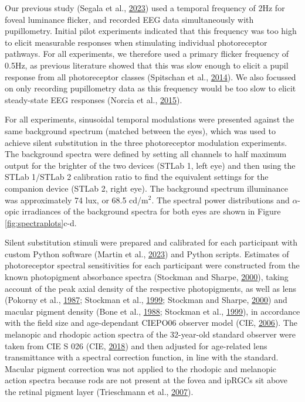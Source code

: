 \documentclass[
]{article}
\begin{document}
Our previous study (Segala et al., \protect\hyperlink{ref-Segala2023}{2023}) used a temporal frequency of 2Hz for foveal luminance flicker, and recorded EEG data simultaneously with pupillometry. Initial pilot experiments indicated that this frequency was too high to elicit measurable responses when stimulating individual photoreceptor pathways. For all experiments, we therefore used a primary flicker frequency of 0.5Hz, as previous literature showed that this was slow enough to elicit a pupil response from all photoreceptor classes (Spitschan et al., \protect\hyperlink{ref-Spitschan2014}{2014}). We also focussed on only recording pupillometry data as this frequency would be too slow to elicit steady-state EEG responses (Norcia et al., \protect\hyperlink{ref-Norcia2015}{2015}).

For all experiments, sinusoidal temporal modulations were presented against the same background spectrum (matched between the eyes), which was used to achieve silent substitution in the three photoreceptor modulation experiments. The background spectra were defined by setting all channels to half maximum output for the brighter of the two devices (STLab 1, left eye) and then using the STLab 1/STLab 2 calibration ratio to find the equivalent settings for the companion device (STLab 2, right eye). The background spectrum illuminance was approximately 74 lux, or 68.5 cd/m\(^2\). The spectral power distributions and \(\alpha\)-opic irradiances of the background spectra for both eyes are shown in Figure \ref{fig:spectraplots}c-d.

Silent substitution stimuli were prepared and calibrated for each participant with custom Python software (Martin et al., \protect\hyperlink{ref-Martin2023}{2023}) and Python scripts. Estimates of photoreceptor spectral sensitivities for each participant were constructed from the known photopigment absorbance spectra (Stockman and Sharpe, \protect\hyperlink{ref-Stockman2000}{2000}), taking account of the peak axial density of the respective photopigments, as well as lens (Pokorny et al., \protect\hyperlink{ref-Pokorny1987}{1987}; Stockman et al., \protect\hyperlink{ref-Stockman1999}{1999}; Stockman and Sharpe, \protect\hyperlink{ref-Stockman2000}{2000}) and macular pigment density (Bone et al., \protect\hyperlink{ref-Bone1988}{1988}; Stockman et al., \protect\hyperlink{ref-Stockman1999}{1999}), in accordance with the field size and age-dependant CIEPO06 observer model (CIE, \protect\hyperlink{ref-CIE2006}{2006}). The melanopic and rhodopic action spectra of the 32-year-old standard observer were taken from CIE S 026 (CIE, \protect\hyperlink{ref-CIE2018}{2018}) and then adjusted for age-related lens transmittance with a spectral correction function, in line with the standard. Macular pigment correction was not applied to the rhodopic and melanopic action spectra because rods are not present at the fovea and ipRGCs sit above the retinal pigment layer (Trieschmann et al., \protect\hyperlink{ref-Trieschmann2007}{2007}).
\end{document}
